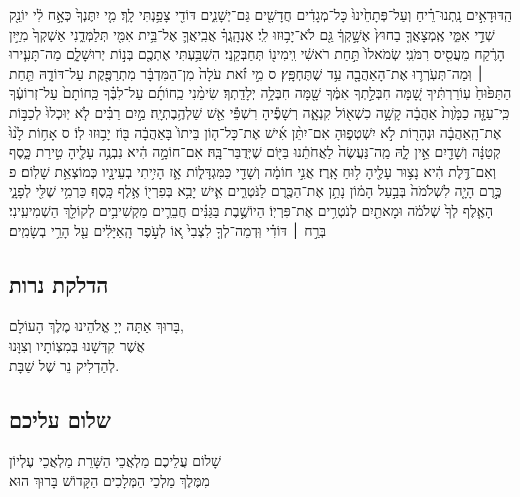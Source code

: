 \documentclass[11pt,twoside]{article}
\begin{document}
{הַֽדּוּדָאִ֣ים נָֽתְנוּ־רֵ֗יחַ וְעַל־פְּתָחֵ֙ינוּ֙ כָּל־מְגָדִ֔ים חֲדָשִׁ֖ים גַּם־יְשָׁנִ֑ים דּוֹדִ֖י צָפַ֥נְתִּי לָֽךְ׃
מִ֤י יִתֶּנְךָ֙ כְּאָ֣ח לִ֔י יוֹנֵ֖ק שְׁדֵ֣י אִמִּ֑י אֶֽמְצָאֲךָ֤ בַחוּץ֙ אֶשָׁ֣קְךָ֔ גַּ֖ם לֹא־יָב֥וּזוּ לִֽי׃
אֶנְהָֽגֲךָ֗ אֲבִֽיאֲךָ֛ אֶל־בֵּ֥ית אִמִּ֖י תְּלַמְּדֵ֑נִי אַשְׁקְךָ֙ מִיַּ֣יִן הָרֶ֔קַח מֵעֲסִ֖יס רִמֹּנִֽי׃
שְׂמֹאלוֹ֙ תַּ֣חַת רֹאשִׁ֔י וִֽימִינ֖וֹ תְּחַבְּקֵֽנִי׃
הִשְׁבַּ֥עְתִּי אֶתְכֶ֖ם בְּנ֣וֹת יְרוּשָׁלָ֑͏ִם מַה־תָּעִ֧ירוּ ׀ וּֽמַה־תְּעֹֽרְר֛וּ אֶת־הָאַהֲבָ֖ה עַ֥ד שֶׁתֶּחְפָּֽץ׃ ס
מִ֣י זֹ֗את עֹלָה֙ מִן־הַמִּדְבָּ֔ר מִתְרַפֶּ֖קֶת עַל־דּוֹדָ֑הּ תַּ֤חַת הַתַּפּ֙וּחַ֙ עֽוֹרַרְתִּ֔יךָ שָׁ֚מָּה חִבְּלַ֣תְךָ אִמֶּ֔ךָ שָׁ֖מָּה חִבְּלָ֥ה יְלָדַֽתְךָ׃
שִׂימֵ֨נִי כַֽחוֹתָ֜ם עַל־לִבֶּ֗ךָ כַּֽחוֹתָם֙ עַל־זְרוֹעֶ֔ךָ כִּֽי־עַזָּ֤ה כַמָּ֙וֶת֙ אַהֲבָ֔ה קָשָׁ֥ה כִשְׁא֖וֹל קִנְאָ֑ה רְשָׁפֶ֕יהָ רִשְׁפֵּ֕י אֵ֖שׁ שַׁלְהֶ֥בֶתְיָֽה׃
מַ֣יִם רַבִּ֗ים לֹ֤א יֽוּכְלוּ֙ לְכַבּ֣וֹת אֶת־הָֽאַהֲבָ֔ה וּנְהָר֖וֹת לֹ֣א יִשְׁטְפ֑וּהָ אִם־יִתֵּ֨ן אִ֜ישׁ אֶת־כָּל־ה֤וֹן בֵּיתוֹ֙ בָּאַהֲבָ֔ה בּ֖וֹז יָב֥וּזוּ לֽוֹ׃ ס
אָח֥וֹת לָ֙נוּ֙ קְטַנָּ֔ה וְשָׁדַ֖יִם אֵ֣ין לָ֑הּ מַֽה־נַּעֲשֶׂה֙ לַאֲחֹתֵ֔נוּ בַּיּ֖וֹם שֶׁיְּדֻבַּר־בָּֽהּ׃
אִם־חוֹמָ֣ה הִ֔יא נִבְנֶ֥ה עָלֶ֖יהָ טִ֣ירַת כָּ֑סֶף וְאִם־דֶּ֣לֶת הִ֔יא נָצ֥וּר עָלֶ֖יהָ ל֥וּחַ אָֽרֶז׃
אֲנִ֣י חוֹמָ֔ה וְשָׁדַ֖י כַּמִּגְדָּל֑וֹת אָ֛ז הָיִ֥יתִי בְעֵינָ֖יו כְּמוֹצְאֵ֥ת שָׁלֽוֹם׃ פ
כֶּ֣רֶם הָיָ֤ה לִשְׁלֹמֹה֙ בְּבַ֣עַל הָמ֔וֹן נָתַ֥ן אֶת־הַכֶּ֖רֶם לַנֹּטְרִ֑ים אִ֛ישׁ יָבִ֥א בְּפִרְי֖וֹ אֶ֥לֶף כָּֽסֶף׃
כַּרְמִ֥י שֶׁלִּ֖י לְפָנָ֑י הָאֶ֤לֶף לְךָ֙ שְׁלֹמֹ֔ה וּמָאתַ֖יִם לְנֹטְרִ֥ים אֶת־פִּרְיֽוֹ׃
הַיוֹשֶׁ֣בֶת בַּגַּנִּ֗ים חֲבֵרִ֛ים מַקְשִׁיבִ֥ים לְקוֹלֵ֖ךְ הַשְׁמִיעִֽינִי׃
בְּרַ֣ח ׀ דּוֹדִ֗י וּֽדְמֵה־לְךָ֤ לִצְבִי֙ א֚וֹ לְעֹ֣פֶר הָֽאַיָּלִ֔ים עַ֖ל הָרֵ֥י בְשָׂמִֽים׃\par
}
\newpage

\subsection{הדלקת נרות}

{\centering\Large%
בָּרוּךְ אַתָּה יְיָ אֱלֹהֵינוּ מֶלֶךְ הָעוֹלָם,\\
אֲשֶׁר קִדְּשָׁנוּ בְּמִצְוֹתָיו וְצִוָּנוּ\\
\huge%
לְהַדְלִיק נֵר שֶׁל שַׁבָּת.\par
}
\vfill
\subsection{שלום עליכם}

שָׁלוֹם עֲלֵיכֶם מַלְאֲכֵי הַשָּׁרֵת מַלְאֲכֵי עֶלְיוֹן\\
\phantom{.}\hfill%
מִמֶּלֶךְ מַלְכֵי הַמְּלָכִים הַקָּדוֹשׁ בָּרוּךְ הוּא
\end{document}
